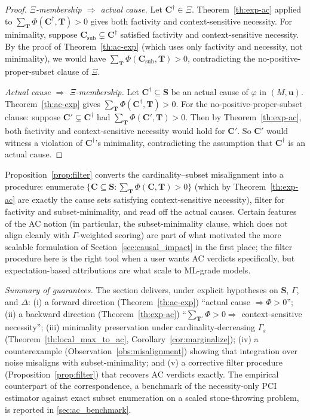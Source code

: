 \begin{proof}
\emph{$\Xi$-membership $\Rightarrow$ actual cause.} Let $\mathbf{C}^\dagger\in\Xi$.
Theorem~\ref{th:exp-ac} applied to $\sum_{\mathbf{T}}\Phi(\mathbf{C}^\dagger,\mathbf{T})>0$
gives both factivity and context-sensitive necessity. For minimality, suppose
$\mathbf{C}_{\text{sub}}\subsetneq\mathbf{C}^\dagger$ satisfied factivity and
context-sensitive necessity. By the proof of Theorem~\ref{th:ac-exp} (which uses
only factivity and necessity, not minimality), we would have
$\sum_{\mathbf{T}}\Phi(\mathbf{C}_{\text{sub}},\mathbf{T})>0$, contradicting the
no-positive-proper-subset clause of $\Xi$.

\emph{Actual cause $\Rightarrow$ $\Xi$-membership.} Let $\mathbf{C}^\dagger\subseteq\mathbf{S}$
be an actual cause of $\varphi$ in $(M,\mathbf{u})$. Theorem~\ref{th:ac-exp} gives
$\sum_{\mathbf{T}}\Phi(\mathbf{C}^\dagger,\mathbf{T})>0$. For the no-positive-proper-subset
clause: suppose $\mathbf{C}'\subsetneq\mathbf{C}^\dagger$ had
$\sum_{\mathbf{T}}\Phi(\mathbf{C}',\mathbf{T})>0$. Then by Theorem~\ref{th:exp-ac},
both factivity and context-sensitive necessity would hold for $\mathbf{C}'$. So
$\mathbf{C}'$ would witness a violation of $\mathbf{C}^\dagger$'s minimality,
contradicting the assumption that $\mathbf{C}^\dagger$ is an actual cause.
\end{proof}

\noindent Proposition~\ref{prop:filter} converts the cardinality--subset misalignment
into a procedure: enumerate $\{\mathbf{C}\subseteq\mathbf{S}:\sum_{\mathbf{T}}\Phi(\mathbf{C},\mathbf{T})>0\}$
(which by Theorem~\ref{th:exp-ac} are exactly the cause sets satisfying
context-sensitive necessity), filter for factivity and subset-minimality, and read off
the actual causes. Certain features of the AC notion (in particular, the
subset-minimality clause, which does not align cleanly with $\Gamma$-weighted scoring) are
part of what motivated the more scalable \ourapproach{} formulation of
Section~\ref{sec:causal_impact} in the first place; the filter procedure here is the
right tool when a user wants AC verdicts specifically, but expectation-based
\ourapproach{} attributions are what scale to ML-grade models.

\medskip\noindent\textit{Summary of guarantees.} The section delivers, under explicit
hypotheses on $\mathbf{S}$, $\Gamma$, and $\Delta$:
(i) a forward direction (Theorem~\ref{th:ac-exp})
``actual cause $\Rightarrow\Phi>0$'';
(ii) a backward direction (Theorem~\ref{th:exp-ac})
``$\sum_{\mathbf{T}'}\Phi>0\Rightarrow$ context-sensitive necessity'';
(iii) minimality preservation under cardinality-decreasing $\Gamma_s$
(Theorem~\ref{th:local_max_to_ac}, Corollary~\ref{cor:marginalize});
(iv) a counterexample (Observation~\ref{obs:misalignment}) showing that integration
over noise misaligns with subset-minimality; and
(v) a corrective filter procedure (Proposition~\ref{prop:filter}) that recovers AC
verdicts exactly. The empirical counterpart of the correspondence, a benchmark of
the necessity-only PCI estimator against exact subset enumeration on a scaled
stone-throwing problem, is reported in \cref{sec:ac_benchmark}.

